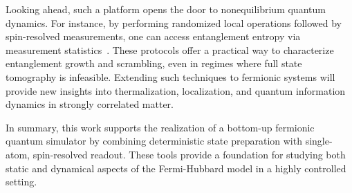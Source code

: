Looking ahead, such a platform opens the door to nonequilibrium quantum dynamics. For instance, by performing randomized local operations followed by spin-resolved measurements, one can access entanglement entropy via measurement statistics~\cite{brydges_probing_2019}. These protocols offer a practical way to characterize entanglement growth and scrambling, even in regimes where full state tomography is infeasible. Extending such techniques to fermionic systems will provide new insights into thermalization, localization, and quantum information dynamics in strongly correlated matter.

In summary, this work supports the realization of a bottom-up fermionic quantum simulator by combining deterministic state preparation with single-atom, spin-resolved readout. These tools provide a foundation for studying both static and dynamical aspects of the Fermi-Hubbard model in a highly controlled setting.
